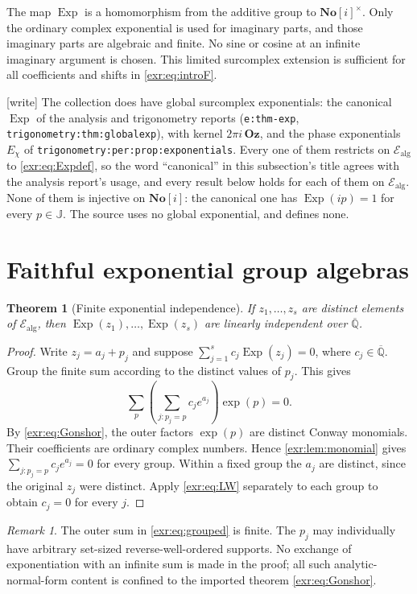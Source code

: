 \documentclass[11pt,letterpaper]{article}
\numberwithin{equation}{section}
\newtheorem{theorem}{Theorem}[section]
\theoremstyle{definition}
\theoremstyle{remark}
\newtheorem{remark}[remark]{Remark}
\newcommand{\Oz}{\mathbf{Oz}}
\newcommand{\SC}{\mathbf{No}[i]}
\newcommand{\Qb}{\overline{\mathbb Q}}
\newcommand{\J}{\mathbb J}
\newcommand{\Ealg}{\mathcal E_{\mathrm{alg}}}
\newcommand{\Exp}{\operatorname{Exp}}
\newcommand{\lbl}[1]{\nolinkurl{#1}}%
\newcommand{\wtag}{\textup{[write]}}%
\begin{document}
The map $\Exp$ is a homomorphism from the additive group to $\SC^\times$.
Only the ordinary complex exponential is used for imaginary parts, and those
imaginary parts are algebraic and finite. No sine or cosine at an infinite
imaginary argument is chosen. This limited surcomplex extension is sufficient for
all coefficients and shifts in \eqref{exr:eq:introF}.

\wtag{} The collection does have global surcomplex exponentials: the
canonical $\Exp$ of the analysis and trigonometry reports
(\lbl{e:thm-exp}, \lbl{trigonometry:thm:globalexp}), with kernel
$2\pi i\,\Oz$, and the phase exponentials $E_\chi$ of
\lbl{trigonometry:per:prop:exponentials}. Every one of them restricts on
$\Ealg$ to \eqref{exr:eq:Expdef}, so the word ``canonical'' in this
subsection's title agrees with the analysis report's usage, and every result
below holds for each of them on $\Ealg$. None of them is injective on
$\SC$: the canonical one has $\Exp(ip)=1$ for every $p\in\J$. The source
uses no global exponential, and defines none.

\section{Faithful exponential group algebras}\label{exr:sec:faithful}
\begin{theorem}[Finite exponential independence]\label{exr:thm:independence}
If $z_1,\ldots,z_s$ are distinct elements of $\Ealg$, then
$\Exp(z_1),\ldots,\Exp(z_s)$ are linearly independent over $\Qb$.
\end{theorem}
\begin{proof}
Write $z_j=a_j+p_j$ and suppose
$\sum_{j=1}^s c_j\Exp(z_j)=0$, where $c_j\in\Qb$. Group the finite sum according to
the distinct values of $p_j$. This gives
\begin{equation}\label{exr:eq:grouped}
 \sum_{p}\left(\sum_{j:p_j=p}c_j e^{a_j}\right)\exp(p)=0.
\end{equation}
By \eqref{exr:eq:Gonshor}, the outer factors $\exp(p)$ are distinct Conway monomials.
Their coefficients are ordinary complex numbers. Hence \cref{exr:lem:monomial} gives
$\sum_{j:p_j=p}c_j e^{a_j}=0$ for every group. Within a fixed group the $a_j$ are
distinct, since the original $z_j$ were distinct. Apply \eqref{exr:eq:LW} separately
to each group to obtain $c_j=0$ for every $j$.
\end{proof}

\begin{remark}
The outer sum in \eqref{exr:eq:grouped} is finite. The $p_j$ may individually have
arbitrary set-sized reverse-well-ordered supports. No exchange of exponentiation
with an infinite sum is made in the proof; all such analytic-normal-form content
is confined to the imported theorem \eqref{exr:eq:Gonshor}.
\end{remark}
\end{document}
